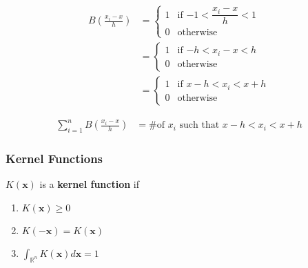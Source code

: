 \documentclass[xcolor={dvipsnames}]{beamer}
\newcommand{\vx}{\mathbf{x}}
\newcommand{\RR}{\mathbb{R}}
\begin{document}
\begin{frame}
\begin{align*}
B\left(\frac{x_i - x}h\right) &= \begin{cases}
    1&\text{if $-1<\dfrac{x_i-x}h$}<1\\[1ex]
    0&\text{otherwise}
\end{cases}\\[1ex]
&= \begin{cases}
    1&\text{if $-h<x_i-x<h$}\\[1ex]
    0&\text{otherwise}
\end{cases}\\[1ex]
&= \begin{cases}
    1&\text{if $x-h<x_i<x+h$}\\[1ex]
    0&\text{otherwise}
\end{cases}
\end{align*}
    
\end{frame}

\begin{frame}
\begin{align*}
    \sum_{i=1}^n B\left(\frac{x_i - x}h\right) &= \text{\# of $x_i$ such that $x-h < x_i < x+h$}
\end{align*}
    

\end{frame}

\begin{frame}
    \frametitle{Kernel Functions}
    \setlength\parskip{0.75em}

    $K(\vx)$ is a \textbf{kernel function} if
    \begin{enumerate}
        \setlength\parskip{0.75em}
        \item $K(\vx)\geq 0$
        \item $K(-\vx)=K(\vx)$
        \item $\displaystyle \int_{\RR^n}K(\vx)d\vx = 1$
    \end{enumerate}
\end{frame}
\end{document}
